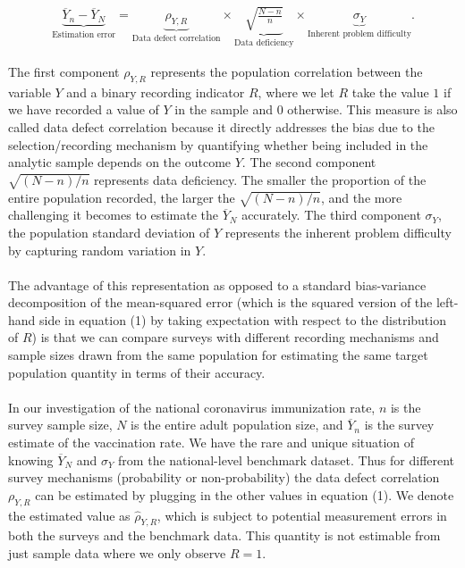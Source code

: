 \documentclass{article}
\begin{document}
\begin{align}
    \underbrace{\overline{Y}_n - \overline{Y}_N}_\textrm{Estimation error} = \underbrace{\rho_{Y, R}}_\textrm{Data defect correlation} \times \underbrace{\sqrt{\frac{N - n}{n}}}_\textrm{Data deficiency} \times \underbrace{\sigma_{Y}}_\textrm{Inherent problem difficulty}.
\end{align}

\noindent The first component ${\rho}_{Y, R}$ represents the population correlation between the variable $Y$ and a binary recording indicator $R$, where we let $R$ take the value $1$ if we have recorded a value of $Y$ in the sample and 0 otherwise. This measure is also called data defect correlation because it directly addresses the bias due to the selection/recording mechanism by quantifying whether being included in the analytic sample depends on the outcome $Y$. The second component $\sqrt{(N-n) \slash n}$ represents data deficiency. The smaller the proportion of the entire population recorded, the larger the $\sqrt{(N-n) \slash n}$, and the more challenging it becomes to estimate the $\overline{Y}_N$ accurately. The third component $\sigma_{Y}$, the population standard deviation of $Y$ represents the inherent problem difficulty by capturing random variation in $Y$. 
\\
\\
The advantage of this representation as opposed to a standard bias-variance decomposition of the mean-squared error (which is the squared version of the left-hand side in equation (1) by taking expectation with respect to the distribution of $R$) is that we can compare surveys with different recording mechanisms and sample sizes drawn from the same population for estimating the same target population quantity in terms of their accuracy.
\\
\\
In our investigation of the national coronavirus immunization rate, $n$ is the survey sample size, $N$ is the entire adult population size, and $\overline{Y}_n$ is the survey estimate of the vaccination rate. We have the rare and unique situation of knowing $\overline{Y}_N$ and $\sigma_{Y}$ from the national-level benchmark dataset. Thus for different survey mechanisms (probability or non-probability) the data defect correlation $\rho_{Y, R}$ can be estimated by plugging in the other values in equation (1). We denote the estimated value as $\hat{\rho}_{Y, R}$, which is subject to potential measurement errors in both the surveys and the benchmark data. This quantity is not estimable from just sample data where we only observe $R=1$. 
\end{document}
